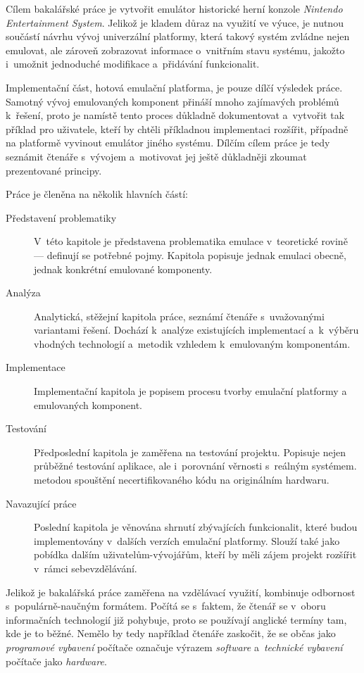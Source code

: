 Cílem bakalářské práce je vytvořit emulátor historické herní konzole \emph{Nintendo Entertainment System}. Jelikož je kladem důraz na využití ve výuce, je nutnou součástí návrhu vývoj univerzální platformy, která takový systém zvládne nejen emulovat, ale zároveň zobrazovat informace o~vnitřním stavu systému, jakožto i~umožnit jednoduché modifikace a~přidávání funkcionalit.

Implementační část, hotová emulační platforma, je pouze dílčí výsledek práce. Samotný vývoj emulovaných komponent přináší mnoho zajímavých problémů k~řešení, proto je namístě tento proces důkladně dokumentovat a~vytvořit tak příklad pro uživatele, kteří by chtěli příkladnou implementaci rozšířit, případně na platformě vyvinout emulátor jiného systému. Dílčím cílem práce je tedy seznámit čtenáře s~vývojem a~motivovat jej  ještě důkladněji zkoumat prezentované principy.

Práce je členěna na několik hlavních částí:
\begin{description}
	\item[Představení problematiky] V~této kapitole je představena problematika emulace v~teoretické rovině --- definují se potřebné pojmy. Kapitola popisuje jednak emulaci obecně, jednak konkrétní emulované komponenty.
	\item[Analýza] Analytická, stěžejní kapitola práce, seznámí čtenáře s~uvažovanými variantami řešení. Dochází k~analýze existujících implementací a~k~výběru vhodných technologií a~metodik vzhledem k~emulovaným komponentám.
	\item[Implementace] Implementační kapitola je popisem procesu tvorby emulační platformy a emulovaných komponent.
	\item[Testování] Předposlední kapitola je zaměřena na testování projektu. Popisuje nejen průběžné testování aplikace, ale i~porovnání věrnosti s~reálným systémem. metodou spouštění necertifikovaného kódu na originálním hardwaru.
	\item[Navazující práce] Poslední kapitola je věnována shrnutí zbývajících funkcionalit, které budou implementovány v~dalších verzích emulační platformy. Slouží také jako pobídka dalším uživatelům-vývojářům, kteří by měli zájem projekt rozšířit v~rámci sebevzdělávání.
\end{description}

\begin{note*}[Terminologie]
	Jelikož je bakalářská práce zaměřena na vzdělávací využití, kombinuje odbornost s~populárně-naučným formátem. Počítá se s~faktem, že čtenář se v~oboru informačních technologií již pohybuje, proto se používají anglické termíny tam, kde je to běžné. Nemělo by tedy například čtenáře zaskočit, že se občas jako \emph{programové vybavení} počítače označuje výrazem \emph{software} a~\emph{technické vybavení} počítače jako \emph{hardware}.
\end{note*}

